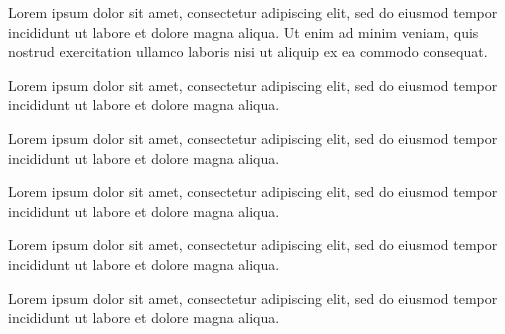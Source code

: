 \documentclass[11pt]{article}
\begin{document}
\smallskip

\smallskip

Lorem ipsum dolor sit amet, consectetur adipiscing elit, sed do eiusmod tempor incididunt ut labore et dolore magna aliqua. Ut enim ad minim veniam, quis nostrud exercitation ullamco laboris nisi ut aliquip ex ea commodo consequat.
\medskip


\smallskip

\smallskip

Lorem ipsum dolor sit amet, consectetur adipiscing elit, sed do eiusmod tempor incididunt ut labore et dolore magna aliqua.
\medskip

\smallskip

Lorem ipsum dolor sit amet, consectetur adipiscing elit, sed do eiusmod tempor incididunt ut labore et dolore magna aliqua.
\medskip

\smallskip

Lorem ipsum dolor sit amet, consectetur adipiscing elit, sed do eiusmod tempor incididunt ut labore et dolore magna aliqua.
\bigskip


\medskip


\smallskip

Lorem ipsum dolor sit amet, consectetur adipiscing elit, sed do eiusmod tempor incididunt ut labore et dolore magna aliqua.
\medskip


\smallskip

Lorem ipsum dolor sit amet, consectetur adipiscing elit, sed do eiusmod tempor incididunt ut labore et dolore magna aliqua.
\medskip
\end{document}
